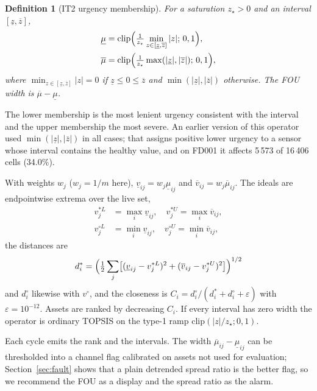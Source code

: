 \documentclass[journal,10pt,twocolumn]{IEEEtran}
\newtheorem{definition}{Definition}
\begin{document}
\begin{definition}[IT2 urgency membership]
For a saturation $z_\star>0$ and an interval $[\underline z,\overline z]$,
\begin{align}
\underline{\mu}&=\mathrm{clip}\Bigl(\tfrac{1}{z_\star}\min_{z\in[\underline z,\overline z]}|z|;\,0,1\Bigr),\\
\overline{\mu}&=\mathrm{clip}\Bigl(\tfrac{1}{z_\star}\max(|\underline z|,|\overline z|);\,0,1\Bigr),
\end{align}
where $\min_{z\in[\underline z,\overline z]}|z|=0$ if $\underline z\le 0\le\overline z$ and $\min(|\underline z|,|\overline z|)$ otherwise. The FOU width is $\overline\mu-\underline\mu$.
\end{definition}
The lower membership is the most lenient urgency consistent with the interval and the upper membership the most severe. An earlier version of this operator used $\min(|\underline z|,|\overline z|)$ in all cases; that assigns positive lower urgency to a sensor whose interval contains the healthy value, and on FD001 it affects 5\,573 of 16\,406 cells (34.0\%).

With weights $w_j$ ($w_j=1/m$ here), $\underline v_{ij}=w_j\underline\mu_{ij}$ and $\overline v_{ij}=w_j\overline\mu_{ij}$. The ideals are endpointwise extrema over the live set,
\begin{align}
v_j^{\ast L}&=\max_i\underline v_{ij},\quad v_j^{\ast U}=\max_i\overline v_{ij},\label{eq:ideals}\\
v_j^{\circ L}&=\min_i\underline v_{ij},\quad v_j^{\circ U}=\min_i\overline v_{ij},\nonumber
\end{align}
the distances are
\begin{equation}
d_i^{\ast}=\Bigl(\tfrac12\sum_{j}\bigl[(\underline v_{ij}-v_j^{\ast L})^2+(\overline v_{ij}-v_j^{\ast U})^2\bigr]\Bigr)^{1/2}
\label{eq:dplus}
\end{equation}
and $d_i^{\circ}$ likewise with $v^{\circ}$, and the closeness is $C_i=d_i^{\circ}/(d_i^{\ast}+d_i^{\circ}+\varepsilon)$ with $\varepsilon=10^{-12}$. Assets are ranked by decreasing $C_i$. If every interval has zero width the operator is ordinary TOPSIS on the type-1 ramp $\mathrm{clip}(|z|/z_\star;0,1)$.

Each cycle emits the rank and the intervals. The width $\overline\mu_{ij}-\underline\mu_{ij}$ can be thresholded into a channel flag calibrated on assets not used for evaluation; Section~\ref{sec:fault} shows that a plain detrended spread ratio is the better flag, so we recommend the FOU as a display and the spread ratio as the alarm.
\end{document}
